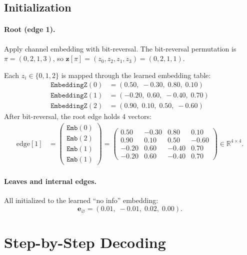 \documentclass[11pt,a4paper]{article}
\newcommand{\R}{\mathbb{R}}
\newcommand{\noinf}{\mathbf{e}_{\varnothing}}
\begin{document}
\subsection{Initialization}

\paragraph{Root (edge 1).} Apply channel embedding with bit-reversal.  The bit-reversal permutation is $\pi = (0,2,1,3)$, so $\mathbf{z}[\pi] = (z_0, z_2, z_1, z_3) = (0, 2, 1, 1)$.

Each $z_i \in \{0,1,2\}$ is mapped through the learned embedding table:
\begin{align*}
\texttt{EmbeddingZ}(0) &= (0.50,\; -0.30,\; 0.80,\; 0.10) \\
\texttt{EmbeddingZ}(1) &= (-0.20,\; 0.60,\; -0.40,\; 0.70) \\
\texttt{EmbeddingZ}(2) &= (0.90,\; 0.10,\; 0.50,\; -0.60)
\end{align*}
After bit-reversal, the root edge holds 4 vectors:
\begin{align*}
\text{edge}[1] &= \begin{pmatrix} \texttt{Emb}(0) \\ \texttt{Emb}(2) \\ \texttt{Emb}(1) \\ \texttt{Emb}(1) \end{pmatrix}
= \begin{pmatrix}
0.50 & -0.30 & 0.80 & 0.10 \\
0.90 & 0.10 & 0.50 & -0.60 \\
-0.20 & 0.60 & -0.40 & 0.70 \\
-0.20 & 0.60 & -0.40 & 0.70
\end{pmatrix} \in \R^{4 \times 4}.
\end{align*}

\paragraph{Leaves and internal edges.} All initialized to the learned ``no info'' embedding:
\[
\noinf = (0.01,\; -0.01,\; 0.02,\; 0.00).
\]

\section{Step-by-Step Decoding}
\label{sec:steps}
\end{document}
